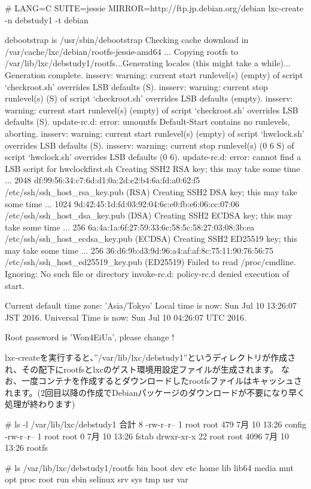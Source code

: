 \documentclass[mingoth,a4paper]{jsarticle}
\begin{document}
\begin{commandline}
  # LANG=C SUITE=jessie MIRROR=http://ftp.jp.debian.org/debian lxc-create -n debstudy1 -t debian

  debootstrap is /usr/sbin/debootstrap
  Checking cache download in /var/cache/lxc/debian/rootfs-jessie-amd64 ...
  Copying rootfs to /var/lib/lxc/debstudy1/rootfs...Generating locales (this might take a while)...
  Generation complete.
  insserv: warning: current start runlevel(s) (empty) of script `checkroot.sh' overrides LSB defaults (S).
  insserv: warning: current stop runlevel(s) (S) of script `checkroot.sh' overrides LSB defaults (empty).
  insserv: warning: current start runlevel(s) (empty) of script `checkroot.sh' overrides LSB defaults (S).
  update-rc.d: error: umountfs Default-Start contains no runlevels, aborting.
  insserv: warning: current start runlevel(s) (empty) of script `hwclock.sh' overrides LSB defaults (S).
  insserv: warning: current stop runlevel(s) (0 6 S) of script `hwclock.sh' overrides LSB defaults (0 6).
  update-rc.d: error: cannot find a LSB script for hwclockfirst.sh
  Creating SSH2 RSA key; this may take some time ...
  2048 df:99:56:34:c7:6d:d1:0a:2d:e2:b4:6a:fd:a0:62:f5 /etc/ssh/ssh_host_rsa_key.pub (RSA)
  Creating SSH2 DSA key; this may take some time ...
  1024 9d:42:45:1d:fd:03:92:04:6c:e0:fb:e6:06:cc:07:06 /etc/ssh/ssh_host_dsa_key.pub (DSA)
  Creating SSH2 ECDSA key; this may take some time ...
  256 6a:4a:1a:6f:27:59:33:6c:58:5c:58:27:03:08:3b:ea /etc/ssh/ssh_host_ecdsa_key.pub (ECDSA)
  Creating SSH2 ED25519 key; this may take some time ...
  256 36:d6:9b:d3:9d:96:a4:af:af:8c:75:11:90:76:56:75 /etc/ssh/ssh_host_ed25519_key.pub (ED25519)
  Failed to read /proc/cmdline. Ignoring: No such file or directory
  invoke-rc.d: policy-rc.d denied execution of start.

  Current default time zone: 'Asia/Tokyo'
  Local time is now:      Sun Jul 10 13:26:07 JST 2016.
  Universal Time is now:  Sun Jul 10 04:26:07 UTC 2016.

  Root password is 'Won4EiUa', please change !
\end{commandline}

lxc-createを実行すると、''/var/lib/lxc/debstudy1''というディレクトリが作成され、その配下にrootfsとlxcのゲスト環境用設定ファイルが生成されます。
なお、一度コンテナを作成するとダウンロードしたrootfsファイルはキャッシュされます。(2回目以降の作成でDebianパッケージのダウンロードが不要になり早く処理が終わります)

\begin{commandline}
  # ls -l /var/lib/lxc/debstudy1
  合計 8
  -rw-r--r--  1 root root  479  7月 10 13:26 config
  -rw-r--r--  1 root root    0  7月 10 13:26 fstab
  drwxr-xr-x 22 root root 4096  7月 10 13:26 rootfs

  # ls /var/lib/lxc/debstudy1/rootfs
  bin  boot  dev  etc  home  lib  lib64  media  mnt  opt  proc  root  run  sbin  selinux  srv  sys  tmp  usr  var
\end{commandline}
\end{document}
